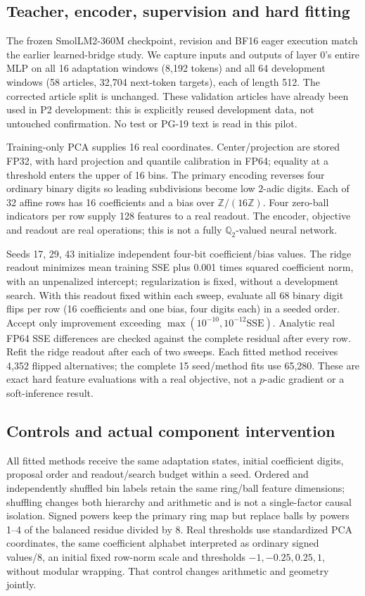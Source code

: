 \documentclass[11pt]{article}
\newcommand{\Q}{\mathbb{Q}}
\newcommand{\Z}{\mathbb{Z}}
\begin{document}
\subsection{Teacher, encoder, supervision and hard fitting}

The frozen SmolLM2-360M checkpoint, revision and BF16 eager execution match
the earlier learned-bridge study. We capture inputs and outputs of layer 0's
entire MLP on all 16 adaptation windows (8,192 tokens) and all 64 development
windows (58 articles, 32,704 next-token targets), each of length 512. The
corrected article split is unchanged. These validation articles have already
been used in P2 development: this is explicitly reused development data,
not untouched confirmation. No test or PG-19 text is read in this pilot.

Training-only PCA supplies 16 real coordinates. Center/projection are stored
FP32, with hard projection and quantile calibration in FP64; equality at a
threshold enters the upper of 16 bins. The primary encoding reverses four
ordinary binary digits so leading subdivisions become low \(2\)-adic digits.
Each of 32 affine rows has 16 coefficients and a bias over \(\Z/(16\Z)\).
Four zero-ball indicators per row supply 128 features to a real readout.
The encoder, objective and readout are real operations; this is not a
fully \(\Q_2\)-valued neural network.

Seeds 17, 29, 43 initialize independent four-bit coefficient/bias values.
The ridge readout minimizes mean training SSE plus 0.001 times squared
coefficient norm, with an unpenalized intercept; regularization is fixed,
without a development search. With this readout fixed within each sweep,
evaluate all 68 binary digit flips per row (16 coefficients and one bias,
four digits each) in a seeded order. Accept only improvement exceeding
\(\max(10^{-10},10^{-12}\mathrm{SSE})\). Analytic real FP64 SSE differences
are checked against the complete residual after every row. Refit the ridge
readout after each of two sweeps. Each fitted method receives 4,352 flipped
alternatives; the complete 15 seed/method fits use 65,280. These are exact
hard feature evaluations with a real objective, not a \(p\)-adic gradient
or a soft-inference result.

\subsection{Controls and actual component intervention}

All fitted methods receive the same adaptation states, initial coefficient
digits, proposal order and readout/search budget within a seed.
Ordered and independently shuffled bin labels retain the same ring/ball
feature dimensions; shuffling changes both hierarchy and arithmetic and is
not a single-factor causal isolation. Signed powers keep the primary ring
map but replace balls by powers 1--4 of the balanced residue divided by 8.
Real thresholds use standardized PCA coordinates, the same coefficient
alphabet interpreted as ordinary signed values/8, an initial fixed row-norm
scale and thresholds \(-1,-0.25,0.25,1\), without modular wrapping.
That control changes arithmetic and geometry jointly.
\end{document}
